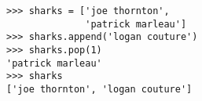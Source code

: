 \vspace{20mm}

\begin{lstlisting}
>>> sharks = ['joe thornton',
              'patrick marleau']
>>> sharks.append('logan couture')
>>> sharks.pop(1)
'patrick marleau'
>>> sharks
['joe thornton', 'logan couture']
\end{lstlisting}
